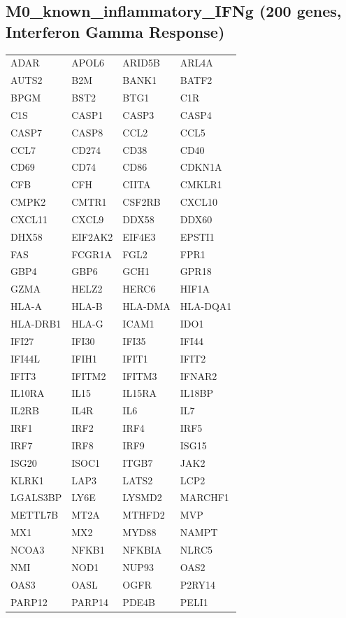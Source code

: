 \subsection*{M0\_known\_inflammatory\_IFNg (200 genes, Interferon Gamma Response)}
\begin{longtable}{llll}
ADAR & APOL6 & ARID5B & ARL4A \\
AUTS2 & B2M & BANK1 & BATF2 \\
BPGM & BST2 & BTG1 & C1R \\
C1S & CASP1 & CASP3 & CASP4 \\
CASP7 & CASP8 & CCL2 & CCL5 \\
CCL7 & CD274 & CD38 & CD40 \\
CD69 & CD74 & CD86 & CDKN1A \\
CFB & CFH & CIITA & CMKLR1 \\
CMPK2 & CMTR1 & CSF2RB & CXCL10 \\
CXCL11 & CXCL9 & DDX58 & DDX60 \\
DHX58 & EIF2AK2 & EIF4E3 & EPSTI1 \\
FAS & FCGR1A & FGL2 & FPR1 \\
GBP4 & GBP6 & GCH1 & GPR18 \\
GZMA & HELZ2 & HERC6 & HIF1A \\
HLA-A & HLA-B & HLA-DMA & HLA-DQA1 \\
HLA-DRB1 & HLA-G & ICAM1 & IDO1 \\
IFI27 & IFI30 & IFI35 & IFI44 \\
IFI44L & IFIH1 & IFIT1 & IFIT2 \\
IFIT3 & IFITM2 & IFITM3 & IFNAR2 \\
IL10RA & IL15 & IL15RA & IL18BP \\
IL2RB & IL4R & IL6 & IL7 \\
IRF1 & IRF2 & IRF4 & IRF5 \\
IRF7 & IRF8 & IRF9 & ISG15 \\
ISG20 & ISOC1 & ITGB7 & JAK2 \\
KLRK1 & LAP3 & LATS2 & LCP2 \\
LGALS3BP & LY6E & LYSMD2 & MARCHF1 \\
METTL7B & MT2A & MTHFD2 & MVP \\
MX1 & MX2 & MYD88 & NAMPT \\
NCOA3 & NFKB1 & NFKBIA & NLRC5 \\
NMI & NOD1 & NUP93 & OAS2 \\
OAS3 & OASL & OGFR & P2RY14 \\
PARP12 & PARP14 & PDE4B & PELI1 \\

\end{longtable}
